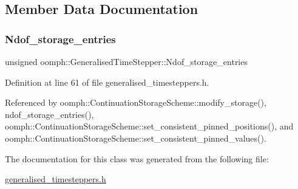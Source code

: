 \subsection{Member Data Documentation}
\mbox{\label{classoomph_1_1GeneralisedTimeStepper_a5041d173762ea30fbd724281df50f1fc}} 
\subsubsection{\texorpdfstring{Ndof\+\_\+storage\+\_\+entries}{Ndof\_storage\_entries}}
{\footnotesize\ttfamily unsigned oomph\+::\+Generalised\+Time\+Stepper\+::\+Ndof\+\_\+storage\+\_\+entries\hspace{0.3cm}{\ttfamily [protected]}}



Definition at line 61 of file generalised\+\_\+timesteppers.\+h.



Referenced by oomph\+::\+Continuation\+Storage\+Scheme\+::modify\+\_\+storage(), ndof\+\_\+storage\+\_\+entries(), oomph\+::\+Continuation\+Storage\+Scheme\+::set\+\_\+consistent\+\_\+pinned\+\_\+positions(), and oomph\+::\+Continuation\+Storage\+Scheme\+::set\+\_\+consistent\+\_\+pinned\+\_\+values().



The documentation for this class was generated from the following file\+:\begin{DoxyCompactItemize}
\item 
\hyperlink{generalised__timesteppers_8h}{generalised\+\_\+timesteppers.\+h}\end{DoxyCompactItemize}
